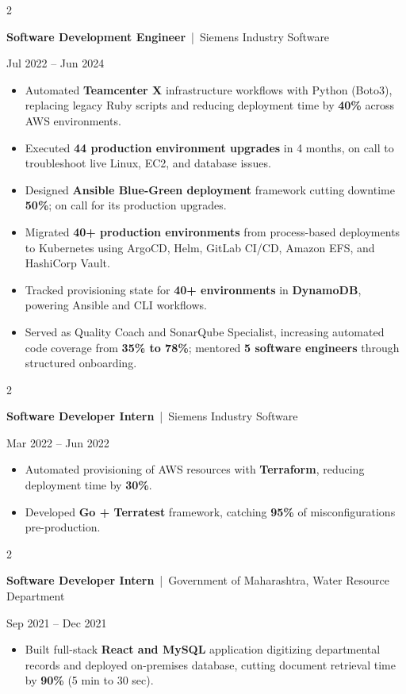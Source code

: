 \documentclass[10pt, letterpaper]{article}
\newenvironment{highlights}{
    \begin{itemize}[
        topsep=0.10 cm,
        parsep=0.06 cm,
        partopsep=0pt,
        itemsep=0.06 cm,
        leftmargin=12pt
    ]
}{
    \end{itemize}
}
\newenvironment{twocolentry}[2][]{
    \onecolentry
    \def\secondColumn{#2}
    \setcolumnwidth{\fill, 4.5 cm}
    \begin{paracol}{2}
}{
    \switchcolumn \raggedleft \secondColumn
    \end{paracol}
    \endonecolentry
}
\begin{document}
\vspace{0.15 cm}

\begin{twocolentry}{Jul 2022 -- Jun 2024}
\textbf{Software Development Engineer} \,|\, Siemens Industry Software
\end{twocolentry}
\begin{highlights}
  \item Automated \textbf{Teamcenter X} infrastructure workflows with Python (Boto3), replacing legacy Ruby scripts and reducing deployment time by \textbf{40\%} across AWS environments.
  \item Executed \textbf{44 production environment upgrades} in 4 months, on call to troubleshoot live Linux, EC2, and database issues.
  \item Designed \textbf{Ansible Blue-Green deployment} framework cutting downtime \textbf{50\%}; on call for its production upgrades.
  \item Migrated \textbf{40+ production environments} from process-based deployments to Kubernetes using ArgoCD, Helm, GitLab CI/CD, Amazon EFS, and HashiCorp Vault.
  \item Tracked provisioning state for \textbf{40+ environments} in \textbf{DynamoDB}, powering Ansible and CLI workflows.
  \item Served as Quality Coach and SonarQube Specialist, increasing automated code coverage from \textbf{35\% to 78\%}; mentored \textbf{5 software engineers} through structured onboarding.
\end{highlights}

\vspace{0.15 cm}

\begin{twocolentry}{Mar 2022 -- Jun 2022}
\textbf{Software Developer Intern} \,|\, Siemens Industry Software
\end{twocolentry}
\begin{highlights}
  \item Automated provisioning of AWS resources with \textbf{Terraform}, reducing deployment time by \textbf{30\%}.
  \item Developed \textbf{Go + Terratest} framework, catching \textbf{95\%} of misconfigurations pre-production.
\end{highlights}

\vspace{0.15 cm}

\begin{twocolentry}{Sep 2021 -- Dec 2021}
\textbf{Software Developer Intern} \,|\, Government of Maharashtra, Water Resource Department
\end{twocolentry}
\begin{highlights}
  \item Built full-stack \textbf{React and MySQL} application digitizing departmental records and deployed on-premises database, cutting document retrieval time by \textbf{90\%} (5 min to 30 sec).
\end{highlights}
\end{document}
